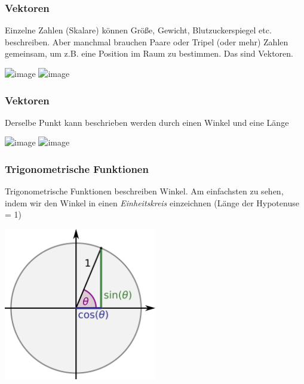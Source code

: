 \documentclass{beamer}
\begin{document}

\begin{frame}
\frametitle{Vektoren}

Einzelne Zahlen (Skalare) können Größe, Gewicht, Blutzuckerspiegel etc. beschreiben.  Aber manchmal brauchen Paare oder Tripel (oder mehr) Zahlen gemeinsam, um z.B. eine Position im Raum zu bestimmen. Das sind Vektoren. \\


\begin{center}
\includegraphics<1>[width=0.6\textwidth]{vectors.png}
\includegraphics<2>[width=0.6\textwidth]{vectors_additon.png}
\end{center}



\end{frame}


\begin{frame}
\frametitle{Vektoren}

Derselbe Punkt kann beschrieben werden durch einen Winkel und eine Länge


\begin{center}
\includegraphics<1>[width=0.6\textwidth]{vectors.png}
\includegraphics<2>[width=0.6\textwidth]{vectors_winkel.png}
\end{center}



\end{frame}



\begin{frame}
\frametitle{Trigonometrische Funktionen}

Trigonometrische Funktionen beschreiben Winkel. Am einfachsten zu sehen, indem wir den Winkel in einen \emph{Einheitskreis} einzeichnen (Länge der Hypotenuse = 1)

\begin{center}
\includegraphics[width=0.5\textwidth]{Einheitskreis.png}
\end{center}



\end{frame}
\end{document}
